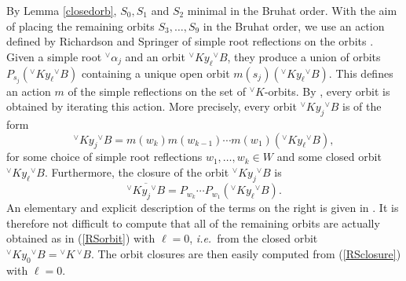 \documentclass[a4paper, 11pt]{article}
\begin{document}
By Lemma \ref{closedorb}, $S_{0}, S_{1}$ and $S_{2}$ minimal in
the Bruhat order.   With the aim of placing the remaining orbits
$S_{3}, \ldots , S_{9}$ 
in the Bruhat order, we use an action defined by Richardson and
Springer  of simple root reflections on the orbits 
 \cite[4.7]{RS90}.  Given a simple root
${^\vee}\alpha_{j}$ and an orbit ${^\vee}Ky_{\ell} {^\vee}B$, they
produce a union of orbits $P_{s_{j}}({^\vee}Ky_{\ell} {^\vee}B)$ 
containing a unique open orbit $m(s_{j})({^\vee}Ky_{\ell}
{^\vee}B)$.  
This defines an action $m$ of the simple reflections on the set of
${^\vee}K$-orbits.   
By \cite[Lemma 4.6]{RS90}, every orbit is obtained by iterating this
action.  More precisely, every orbit ${^\vee}Ky_{j} {^\vee}B$
is of the form  
\begin{equation}
\label{RSorbit}
{^\vee}Ky_{j} {^\vee}B = m(w_{k})m(w_{k-1}) \cdots m(w_{1})
({^\vee}Ky_{\ell} {^\vee}B),
\end{equation} 
for some choice of simple root reflections $w_{1}, \ldots, w_{k} \in W$  
and some  closed orbit ${^\vee}Ky_{\ell} {^\vee}B$.  Furthermore, the
closure of the orbit ${^\vee}Ky_{j} {^\vee}B$ is 
\begin{equation}
\label{RSclosure}
\overline{{^\vee}Ky_{j} {^\vee}B} = P_{w_{k}} \cdots
P_{w_{1}}({^\vee}Ky_{\ell} {^\vee}B).
\end{equation} 
An elementary and explicit description of the terms on the right is given in
\cite[4.3]{RS90}.
 It is  therefore not
difficult to compute that all of the remaining orbits  are actually
obtained as in (\ref{RSorbit}) with $\ell=0$, \emph{i.e.}~from 
the closed orbit ${^\vee}K y_{0} {^\vee}B = {^\vee}K\,
{^\vee}B$.  The orbit closures are then easily computed from
(\ref{RSclosure}) with $\ell = 0$. 
\end{document}
